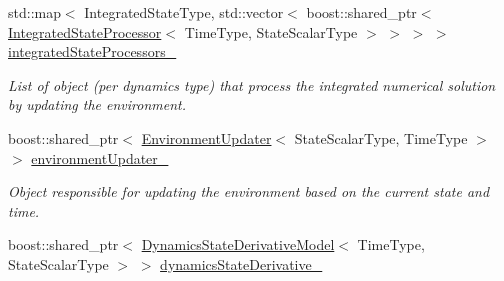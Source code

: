 \begin{DoxyCompactItemize}
\item 
std\+::map$<$ Integrated\+State\+Type, std\+::vector$<$ boost\+::shared\+\_\+ptr$<$ \hyperlink{classtudat_1_1propagators_1_1IntegratedStateProcessor}{Integrated\+State\+Processor}$<$ Time\+Type, State\+Scalar\+Type $>$ $>$ $>$ $>$ \hyperlink{classtudat_1_1propagators_1_1DynamicsSimulator_af42a1bc0d2aacdbfcf3253ff8d3d93e9}{integrated\+State\+Processors\+\_\+}\hypertarget{classtudat_1_1propagators_1_1DynamicsSimulator_af42a1bc0d2aacdbfcf3253ff8d3d93e9}{}\label{classtudat_1_1propagators_1_1DynamicsSimulator_af42a1bc0d2aacdbfcf3253ff8d3d93e9}

\begin{DoxyCompactList}\small\item\em List of object (per dynamics type) that process the integrated numerical solution by updating the environment. \end{DoxyCompactList}\item 
boost\+::shared\+\_\+ptr$<$ \hyperlink{classtudat_1_1propagators_1_1EnvironmentUpdater}{Environment\+Updater}$<$ State\+Scalar\+Type, Time\+Type $>$ $>$ \hyperlink{classtudat_1_1propagators_1_1DynamicsSimulator_a4f2d6fc2e3ffbb06da4f8e621ae1c242}{environment\+Updater\+\_\+}
\begin{DoxyCompactList}\small\item\em Object responsible for updating the environment based on the current state and time. \end{DoxyCompactList}\item 
boost\+::shared\+\_\+ptr$<$ \hyperlink{classtudat_1_1propagators_1_1DynamicsStateDerivativeModel}{Dynamics\+State\+Derivative\+Model}$<$ Time\+Type, State\+Scalar\+Type $>$ $>$ \hyperlink{classtudat_1_1propagators_1_1DynamicsSimulator_a090680ef9e34a4b051f7fb431ae9d9b6}{dynamics\+State\+Derivative\+\_\+}\hypertarget{classtudat_1_1propagators_1_1DynamicsSimulator_a090680ef9e34a4b051f7fb431ae9d9b6}{}\label{classtudat_1_1propagators_1_1DynamicsSimulator_a090680ef9e34a4b051f7fb431ae9d9b6}


\end{DoxyCompactItemize}
